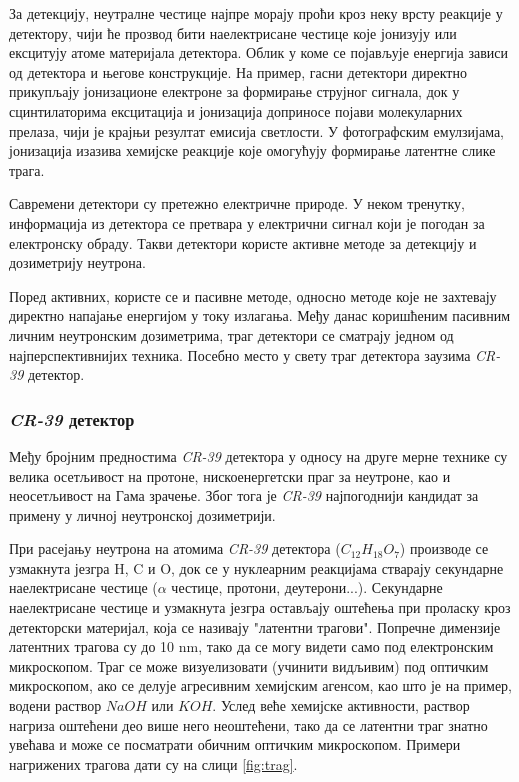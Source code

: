 \documentclass[11pt,a4paper,serbian,oneside]{book}
\begin{document}
За детекцију, неутралне честице најпре морају проћи кроз неку врсту реакције у де\-тек\-то\-ру, чији ће прозвод бити наелектрисане честице које јонизују или ексцитују атоме материјала детектора. Облик у коме се појављује енергија зависи од детектора и његове конструкције.  На пример, гасни детектори директно прикупљају јонизационе електроне за формирање струјног сигнала, док у сцинтилаторима  ексцитација и јонизација доприносе појави молекуларних прелаза, чији је крајњи резултат емисија светлости. У фотографским емулзијама, јонизација изазива хемијске реакције које омогућују формирање латентне слике трага.

Савремени детектори су претежно електричне природе. У неком тренутку, информација из детектора се претвара у електрични сигнал који је погодан за електронску обраду. Такви детектори користе активне методе за детекцију и дозиметрију неутрона. 

Поред активних, користе се и пасивне методе, односно методе које не захтевају директно напајање енергијом у току излагања.  Међу данас коришћеним пасивним личним не\-ут\-рон\-ским дозиметрима, траг детектори се сматрају једном од најперспективнијих техника. Посебно место у свету траг детектора заузима \textit{CR-39} детектор.

\subsubsection{\textit{CR-39} детектор}

Међу бројним предностима \textit{CR-39} детектора у односу на друге мерне технике су велика осетљивост на протоне, нискоенергетски праг за неутроне, као и неосетљивост на Гама зрачење. Због тога је \textit{CR-39} најпогоднији кандидат за примену у личној неутронској дозиметрији.

При расејању неутрона на атомима \textit{CR-39} детектора ($C_{12}H_{18}O_{7}$) производе се
узмакнута језгра H, C и O, док се у нуклеарним реакцијама стварају секундарне
наелектрисане честице ($\alpha$ честице, протони, деутерони...). Секундарне наелектрисане честице и узмакнута језгра остављају оштећења при проласку кроз детекторски материјал, која се називају "латентни трагови". Попречне димензије латентних трагова су до 10 nm, тако да се могу видети само под електронским микроскопом. Траг се може визуелизовати (учинити видљивим) под оптичким микроскопом, ако се делује агресивним хемијским агенсом, као што је на пример, водени раствор $NaOH$ или $KOH$. Услед веће хемијске активности, раствор нагриза оштећени део више него неоштећени, тако да се латентни траг знатно увећава и може се посматрати обичним оптичким микроскопом. Примери нагрижених трагова дати су на слици \ref{fig:trag}.
\end{document}
